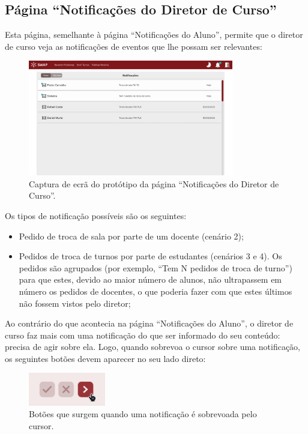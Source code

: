\documentclass[12pt, a4paper]{article}
\begin{document}
\subsection{Página ``Notificações do Diretor de Curso''}

Esta página, semelhante à página ``Notificações do Aluno'', permite que o diretor de curso veja as
notificações de eventos que lhe possam ser relevantes:

\begin{figure}[H]
    \centering
    \includegraphics[width=0.8\textwidth]{res/prototype/notificacoes-diretor.png}
    \caption{Captura de ecrã do protótipo da página ``Notificações do Diretor de Curso''.}
    \label{notificacoes-diretor}
\end{figure}

Os tipos de notificação possíveis são os seguintes:

\begin{itemize}
    \item Pedido de troca de sala por parte de um docente (cenário 2);
    \item Pedidos de troca de turnos por parte de estudantes (cenários 3 e 4). Os pedidos são
        agrupados (por exemplo, ``Tem N pedidos de troca de turno'') para que estes, devido ao maior
        número de alunos, não ultrapassem em número os pedidos de docentes, o que poderia fazer com
        que estes últimos não fossem vistos pelo diretor;
\end{itemize}

Ao contrário do que acontecia na página ``Notificações do Aluno'', o diretor de curso faz mais com
uma notificação do que ser informado do seu conteúdo: precisa de agir sobre ela. Logo, quando
sobrevoa o cursor sobre uma notificação, os seguintes botões devem aparecer no seu lado direto:

\begin{figure}[H]
    \centering
    \includegraphics[width=0.3\textwidth]{res/prototype/notificacoes-diretor-hover.png}
    \caption{Botões que surgem quando uma notificação é sobrevoada pelo cursor.}
    \label{notificacoes-diretor-hover}
\end{figure}
\end{document}

